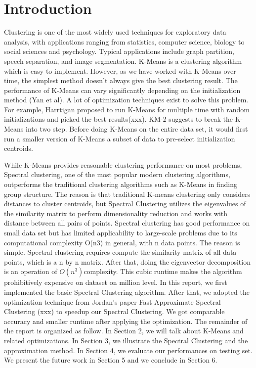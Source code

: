 \documentclass{acm_proc_article-sp}
\begin{document}
\section{Introduction}
Clustering is one of the most widely used techniques for exploratory data analysis,  with applications ranging from statistics, computer science, biology to social sciences and psychology. Typical applications include graph partition, speech separation, and image segmentation. K-Means is a  
clustering algorithm which is easy to implement. However, as we have worked with K-Means over time, the simplest method doesn’t always give the best clustering result. The performance of K-Means can vary significantly depending on the initialization method (Yan et al). A lot of optimization techniques exist to solve this problem. For example, Harrtigan proposed to run K-Means for multiple time with random initializations and picked the best results(xxx). KM-2 suggests to break the K-Means into two step. Before doing K-Means on the entire data set, it would first run a smaller version of K-Means a subset of data to pre-select initialization centroids. 

While K-Means provides reasonable clustering performance on most problems, 
Spectral clustering, one of the most popular modern clustering algorithms, outperforms the traditional clustering algorithms such as K-Means in finding group structure. The reason is that traditional K-means clustering only considers distances to cluster centroids, but Spectral Clustering utilizes the eigenvalues of the similarity matrix to perform dimensionality reduction and works with distance between all pairs of points. Spectral clustering has good performance on small data set but has limited applicability to large-scale problems due to its computational complexity O(n3) in general, with n data points. The reason is simple. Spectral clustering requires compute the similarity matrix of all data points, which is a n by n matrix. After that, doing the eigenvector decomposition is an operation of 
$O(n^3)$complexity. This cubic runtime makes the algorithm prohibitively expensive on dataset on million level. In this report, we  first implemented the basic Spectral Clustering algorithm. After that, we adopted the optimization technique from Jordan’s paper Fast Approximate Spectral Clustering (xxx) to speedup our Spectral Clustering. We got comparable accuracy and smaller runtime after applying the optimization. The remainder of the report is organized as follow. In Section 2, we will talk about K-Means and related optimizations. In Section 3, we illustrate the Spectral Clustering and the approximation method. In Section 4, we evaluate our performances on testing set. We present the future work in Section 5 and we conclude in Section 6.
\end{document}
